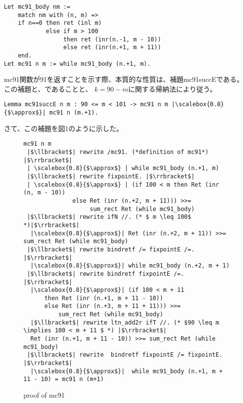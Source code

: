 \documentclass[japanese]{jssst_ppl}
\theoremstyle{definition}
\def\coqin#1{\text{\texttt{#1}}}
\begin{document}
\begin{verbatim}
Let mc91_body nm :=
    match nm with (n, m) =>
    if n==0 then ret (inl m)
            else if m > 100
                 then ret (inr(n.-1, m - 10))
                 else ret (inr(n.+1, m + 11))
    end.
Let mc91 n m := while mc91_body (n.+1, m).
    \end{verbatim}

mc91関数が91を返すことを示す際、本質的な性質は、補題mc91succEである。
この補題と、\coqin{mc91 n 101 |$\approx$| Ret 91}であることと、
$ k =  90 - m $に関する帰納法により従う。



\begin{verbatim}
Lemma mc91succE n m : 90 <= m < 101 -> mc91 n m |\scalebox{0.8}{$\approx$}| mc91 n (m.+1).
\end{verbatim}

さて、この補題を図1のように示した。




\begin{figure}[H]
  \centering

  \begin{verbatim}
mc91 n m
 |$\llbracket$| rewrite /mc91. (*definition of mc91*) |$\rrbracket$|
 | \scalebox{0.8}{$\approx$} | while mc91_body (n.+1, m)
 |$\llbracket$| rewrite fixpointE. |$\rrbracket$|
 | \scalebox{0.8}{$\approx$} | (if 100 < m then Ret (inr (n, m - 10))
              else Ret (inr (n.+2, m + 11))) >>=
                   sum_rect Ret (while mc91_body)
 |$\llbracket$| rewrite ifN //. (* $ m \leq 100$ *)|$\rrbracket$|
  |\scalebox{0.8}{$\approx$}| Ret (inr (n.+2, m + 11)) >>= sum_rect Ret (while mc91_body)
 |$\llbracket$| rewrite bindretf /= fixpointE /=. |$\rrbracket$|
  |\scalebox{0.8}{$\approx$}| while mc91_body (n.+2, m + 1)
 |$\llbracket$| rewrite bindretf fixpointE /=. |$\rrbracket$|
  |\scalebox{0.8}{$\approx$}| (if 100 < m + 11
      then Ret (inr (n.+1, m + 11 - 10))
      else Ret (inr (n.+3, m + 11 + 11))) >>=
          sum_rect Ret (while mc91_body)
  |$\llbracket$| rewrite ltn_add2r ifT //. (* $90 \leq m \implies 100 < m + 11 $ *) |$\rrbracket$|
  Ret (inr (n.+1, m + 11 - 10)) >>= sum_rect Ret (while mc91_body)
 |$\llbracket$| rewrite  bindretf fixpointE /= fixpointE. |$\rrbracket$|
  |\scalebox{0.8}{$\approx$}|  while mc91_body (n.+1, m + 11 - 10) = mc91 n (m+1)

    \end{verbatim}


  \caption{proof of mc91 }
\end{figure}
\end{document}
